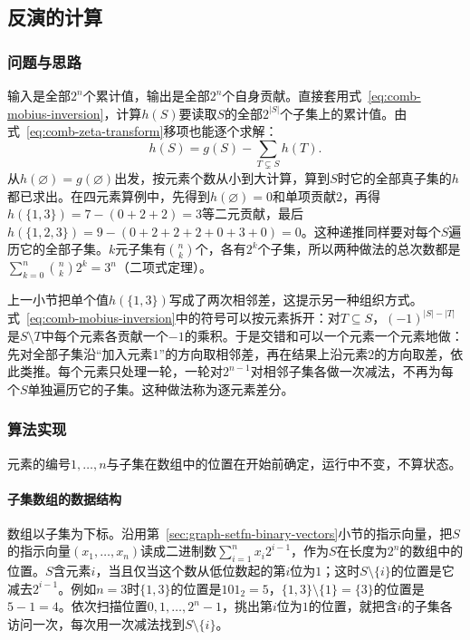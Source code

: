 \subsection{反演的计算}
\label{sec:graph-setfn-mobius-computation}

\subsubsection{问题与思路}

输入是全部$2^n$个累计值，输出是全部$2^n$个自身贡献。直接套用式~\eqref{eq:comb-mobius-inversion}，计算$h(S)$要读取$S$的全部$2^{|S|}$个子集上的累计值。由式~\eqref{eq:comb-zeta-transform}移项也能逐个求解：
\[
  h(S)=g(S)-\sum_{T\subsetneq S}h(T).
\]
从$h(\varnothing)=g(\varnothing)$出发，按元素个数从小到大计算，算到$S$时它的全部真子集的$h$都已求出。在四元素算例中，先得到$h(\varnothing)=0$和单项贡献$2$，再得$h(\{1,3\})=7-(0+2+2)=3$等二元贡献，最后$h(\{1,2,3\})=9-(0+2+2+2+0+3+0)=0$。这种递推同样要对每个$S$遍历它的全部子集。$k$元子集有$\binom nk$个，各有$2^k$个子集，所以两种做法的总次数都是$\sum_{k=0}^{n}\binom nk2^k=3^n$（二项式定理）。

上一小节把单个值$h(\{1,3\})$写成了两次相邻差，这提示另一种组织方式。式~\eqref{eq:comb-mobius-inversion}中的符号可以按元素拆开：对$T\subseteq S$，$(-1)^{|S|-|T|}$是$S\setminus T$中每个元素各贡献一个$-1$的乘积。于是交错和可以一个元素一个元素地做：先对全部子集沿“加入元素$1$”的方向取相邻差，再在结果上沿元素$2$的方向取差，依此类推。每个元素只处理一轮，一轮对$2^{n-1}$对相邻子集各做一次减法，不再为每个$S$单独遍历它的子集。这种做法称为逐元素差分。

\subsubsection{算法实现}

元素的编号$1,\ldots,n$与子集在数组中的位置在开始前确定，运行中不变，不算状态。

\paragraph{子集数组的数据结构}
数组以子集为下标。沿用第~\ref{sec:graph-setfn-binary-vectors}小节的指示向量，把$S$的指示向量$(x_1,\ldots,x_n)$读成二进制数$\sum_{i=1}^{n}x_i2^{i-1}$，作为$S$在长度为$2^n$的数组中的位置。$S$含元素$i$，当且仅当这个数从低位数起的第$i$位为$1$；这时$S\setminus\{i\}$的位置是它减去$2^{i-1}$。例如$n=3$时$\{1,3\}$的位置是$101_2=5$，$\{1,3\}\setminus\{1\}=\{3\}$的位置是$5-1=4$。依次扫描位置$0,1,\ldots,2^n-1$，挑出第$i$位为$1$的位置，就把含$i$的子集各访问一次，每次用一次减法找到$S\setminus\{i\}$。

